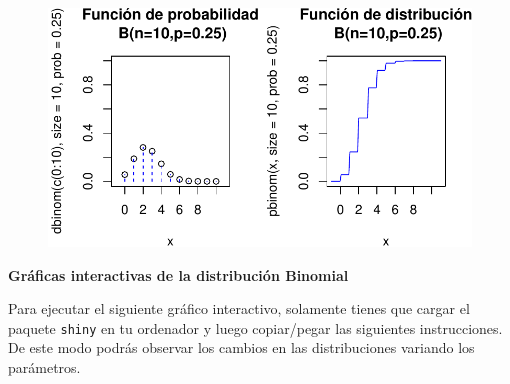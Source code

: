 \documentclass[
  letterpaper,
  DIV=11,
  numbers=noendperiod]{scrreprt}
\begin{document}
\begin{figure}

{\centering \includegraphics{3_files/figure-pdf/unnamed-chunk-12-1.pdf}

}

\end{figure}

\textbf{Gráficas interactivas de la distribución Binomial}

Para ejecutar el siguiente gráfico interactivo, solamente tienes que
cargar el paquete \texttt{shiny} en tu ordenador y luego copiar/pegar
las siguientes instrucciones. De este modo podrás observar los cambios
en las distribuciones variando los parámetros.
\end{document}
